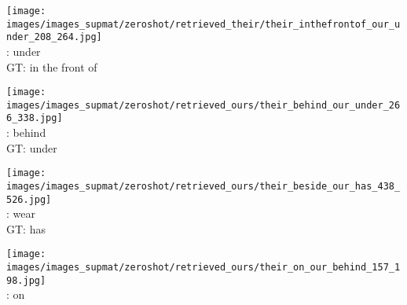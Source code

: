 \documentclass[10pt,twocolumn,letterpaper]{article}
\begin{document}
\begin{figure*}[t]
\begin{minipage}[t]{0.185\textwidth}
    \end{minipage}
    \hspace{0.005\textwidth}  
    \begin{minipage}[t]{0.185\textwidth}
    	\centering
       	\texttt{[image: images/images\_supmat/zeroshot/retrieved\_their/their\_inthefrontof\_our\_under\_208\_264.jpg]}\\
		\vspace{0.3ex}       	
       	\cite{Lu16}: under \\
       	GT: in the front of
      	\vspace{0.2ex}
    \end{minipage} 

    \begin{minipage}[t]{0.185\textwidth}
    	\centering
       	\texttt{[image: images/images\_supmat/zeroshot/retrieved\_ours/their\_behind\_our\_under\_266\_338.jpg]}\\
       	\vspace{0.3ex}
       	\cite{Lu16}: behind \\
       	GT: under
       	\vspace{2ex}
    \end{minipage}
    \hspace{0.005\textwidth}
    \begin{minipage}[t]{0.185\textwidth}
    	\centering
       	\texttt{[image: images/images\_supmat/zeroshot/retrieved\_ours/their\_beside\_our\_has\_438\_526.jpg]}\\
       	\vspace{0.3ex}
       	\cite{Lu16}: wear \\
       	GT: has
       	\vspace{0.2ex}
    \end{minipage}
    \hspace{0.005\textwidth}
    \begin{minipage}[t]{0.185\textwidth}
       \centering
       \texttt{[image: images/images\_supmat/zeroshot/retrieved\_ours/their\_on\_our\_behind\_157\_198.jpg]}\\
       \vspace{0.3ex}
       \cite{Lu16}: on \\

\end{minipage}
\end{figure*}
\end{document}
